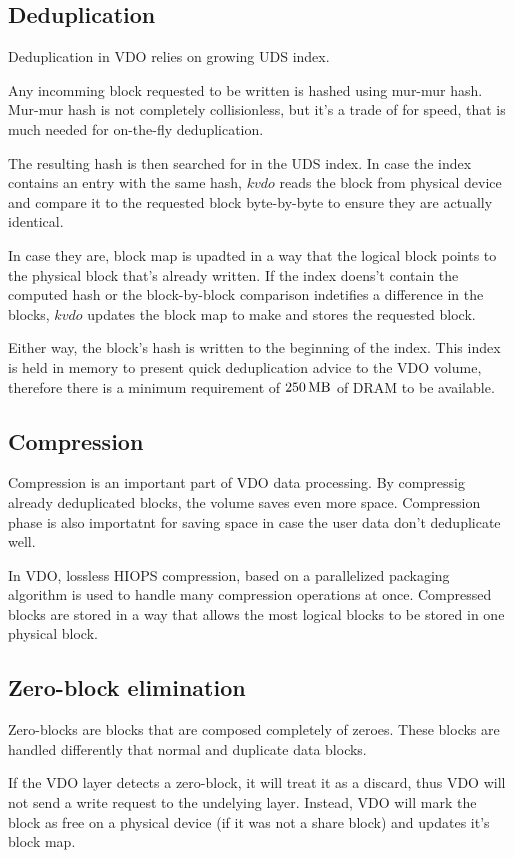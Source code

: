 \documentclass[
  color, %
  table, %
  lof,   %
  lot,   %
]{fithesis3}
\begin{document}
\subsection{Deduplication}
Deduplication in VDO relies on growing UDS index.

Any incomming block requested to be written is hashed using mur-mur hash. Mur-mur hash is not completely collisionless, but it's a trade of for speed, that is much needed for on-the-fly deduplication.

The resulting hash is then searched for in the UDS index. In case the index contains an entry with the same hash, $kvdo$ reads the block from physical device and compare it to the requested block byte-by-byte to ensure they are actually identical.

In case they are, block map is upadted in a way that the logical block points to the physical block that's already written. If the index doens't contain the computed hash or the block-by-block comparison indetifies a difference in the blocks, $kvdo$ updates the block map to make and stores the requested block.

Either way, the block's hash is written to the beginning of the index. This index is held in memory to present quick deduplication advice to the VDO volume, therefore there is a minimum requirement of $\SI{250}{\mega\byte}$ of DRAM to be available.


\subsection{Compression}
Compression  is an important part of VDO data processing. By compressig already deduplicated blocks, the volume saves even more space. Compression phase is also importatnt for saving space in case the user data don't deduplicate well.

In VDO, lossless HIOPS compression, based on a parallelized packaging algorithm is used to handle many compression operations at once. Compressed blocks are stored in a way that allows the most logical blocks to be stored in one physical block.

\subsection{Zero-block elimination}
Zero-blocks are blocks that are composed completely of zeroes. These blocks are handled differently that normal and duplicate data blocks.

If the VDO layer detects a zero-block, it will treat it as a discard, thus VDO will not send a write request to the undelying layer. Instead, VDO will mark the block as free on a physical device (if it was not a share block) and updates it's block map.
\end{document}
